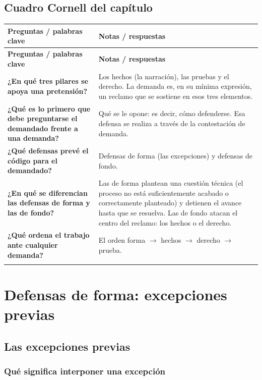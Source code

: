 \documentclass[12pt,oneside]{book}
\newenvironment{cornell}{%
  \begin{longtable}{>{\raggedright\arraybackslash}p{0.26\textwidth}>{\raggedright\arraybackslash}p{0.64\textwidth}}
  \toprule
  \textbf{Preguntas / palabras clave} & \textbf{Notas / respuestas} \\
  \midrule
  \endfirsthead
  \toprule
  \textbf{Preguntas / palabras clave} & \textbf{Notas / respuestas} \\
  \midrule
  \endhead
}{%
  \bottomrule
  \end{longtable}
}
\newcommand{\cornellresumen}[1]{%
  \midrule
  \multicolumn{2}{p{\dimexpr0.90\textwidth+2\tabcolsep\relax}}{\textbf{Resumen:} #1} \\
}
\begin{document}
\section{Cuadro Cornell del capítulo}

\begin{cornell}
\textbf{¿En qué tres pilares se apoya una pretensión?} &
Los hechos (la narración), las pruebas y el derecho. La demanda es, en su mínima expresión, un reclamo que se sostiene en esos tres elementos. \\
\addlinespace
\textbf{¿Qué es lo primero que debe preguntarse el demandado frente a una demanda?} &
Qué se le opone: es decir, cómo defenderse. Esa defensa se realiza a través de la contestación de demanda. \\
\addlinespace
\textbf{¿Qué defensas prevé el código para el demandado?} &
Defensas de forma (las excepciones) y defensas de fondo. \\
\addlinespace
\textbf{¿En qué se diferencian las defensas de forma y las de fondo?} &
Las de forma plantean una cuestión técnica (el proceso no está suficientemente acabado o correctamente planteado) y detienen el avance hasta que se resuelva. Las de fondo atacan el centro del reclamo: los hechos o el derecho. \\
\addlinespace
\textbf{¿Qué ordena el trabajo ante cualquier demanda?} &
El orden forma $\rightarrow$ hechos $\rightarrow$ derecho $\rightarrow$ prueba. \\
\cornellresumen{La demanda es un reclamo apoyado en hechos, pruebas y derecho. El demandado se defiende por la forma (excepciones) o por el fondo (hechos o derecho), siguiendo el orden forma, hechos, derecho y prueba.}
\end{cornell}

\chapter[Defensas de forma: excepciones previas]{Defensas de forma: excepciones previas}

\section{Las excepciones previas}

\subsection{Qué significa interponer una excepción}
\end{document}

